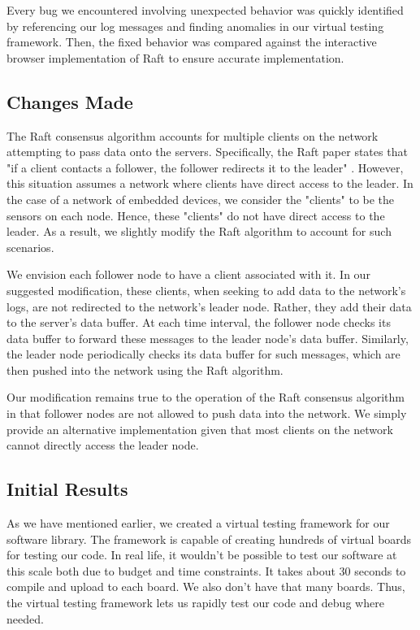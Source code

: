 Every bug we encountered involving unexpected behavior was quickly identified by referencing our log messages and finding anomalies in our virtual testing framework. Then, the fixed behavior was compared against the interactive browser implementation of Raft \cite{raft_webiste} to ensure accurate implementation. 

\subsection{Changes Made}
The Raft consensus algorithm accounts for multiple clients on the network attempting to pass data onto the servers. Specifically, the Raft paper states that "if a client contacts a follower, the follower redirects it to the leader" \cite{raft_paper}. However, this situation assumes a network where clients have direct access to the leader. In the case of a network of embedded devices, we consider the "clients" to be the sensors on each node. Hence, these "clients" do not have direct access to the leader. As a result, we slightly modify the Raft algorithm to account for such scenarios. 

We envision each follower node to have a client associated with it. In our suggested modification, these clients, when seeking to add data to the network's logs, are not redirected to the network's leader node. Rather, they add their data to the server's data buffer. At each time interval, the follower node checks its data buffer to forward these messages to the leader node's data buffer. Similarly, the leader node periodically checks its data buffer for such messages, which are then pushed into the network using the Raft algorithm. 

Our modification remains true to the operation of the Raft consensus algorithm in that follower nodes are not allowed to push data into the network. We simply provide an alternative implementation given that most clients on the network cannot directly access the leader node. 

\subsection{Initial Results}
As we have mentioned earlier, we created a virtual testing framework for our software library. The framework is capable of creating hundreds of virtual boards for testing our code. In real life, it wouldn't be possible to test our software at this scale both due to budget and time constraints. It takes about 30 seconds to compile and upload to each board. We also don't have that many boards. Thus, the virtual testing framework lets us rapidly test our code and debug where needed.


